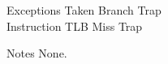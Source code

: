 \begin{iPageDescEntry}{Exceptions}
Taken Branch Trap\\
Instruction TLB Miss Trap
\end{iPageDescEntry}

\begin{iPageDescEntry}{Notes}
None.
\end{iPageDescEntry}

